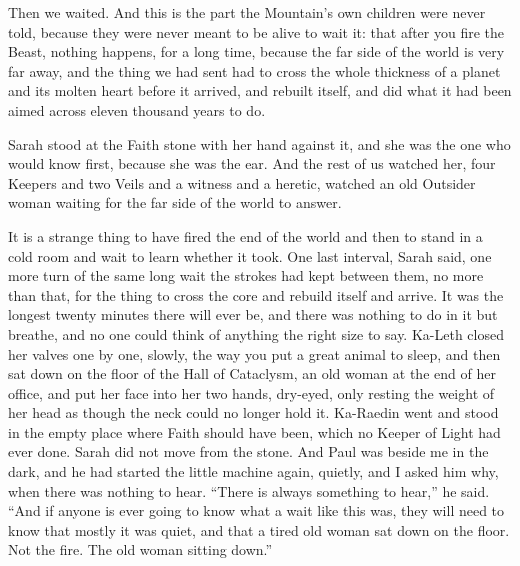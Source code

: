 \ornament

Then we waited. And this is the part the Mountain's own children were never told, because they were never meant to be alive to wait it: that after you fire the Beast, nothing happens, for a long time, because the far side of the world is very far away, and the thing we had sent had to cross the whole thickness of a planet and its molten heart before it arrived, and rebuilt itself, and did what it had been aimed across eleven thousand years to do.\par

Sarah stood at the Faith stone with her hand against it, and she was the one who would know first, because she was the ear. And the rest of us watched her, four Keepers and two Veils and a witness and a heretic, watched an old Outsider woman waiting for the far side of the world to answer.\par

It is a strange thing to have fired the end of the world and then to stand in a cold room and wait to learn whether it took. One last interval, Sarah said, one more turn of the same long wait the strokes had kept between them, no more than that, for the thing to cross the core and rebuild itself and arrive. It was the longest twenty minutes there will ever be, and there was nothing to do in it but breathe, and no one could think of anything the right size to say. Ka-Leth closed her valves one by one, slowly, the way you put a great animal to sleep, and then sat down on the floor of the Hall of Cataclysm, an old woman at the end of her office, and put her face into her two hands, dry-eyed, only resting the weight of her head as though the neck could no longer hold it. Ka-Raedin went and stood in the empty place where Faith should have been, which no Keeper of Light had ever done. Sarah did not move from the stone. And Paul was beside me in the dark, and he had started the little machine again, quietly, and I asked him why, when there was nothing to hear. ``There is always something to hear,'' he said. ``And if anyone is ever going to know what a wait like this was, they will need to know that mostly it was quiet, and that a tired old woman sat down on the floor. Not the fire. The old woman sitting down.''\par

